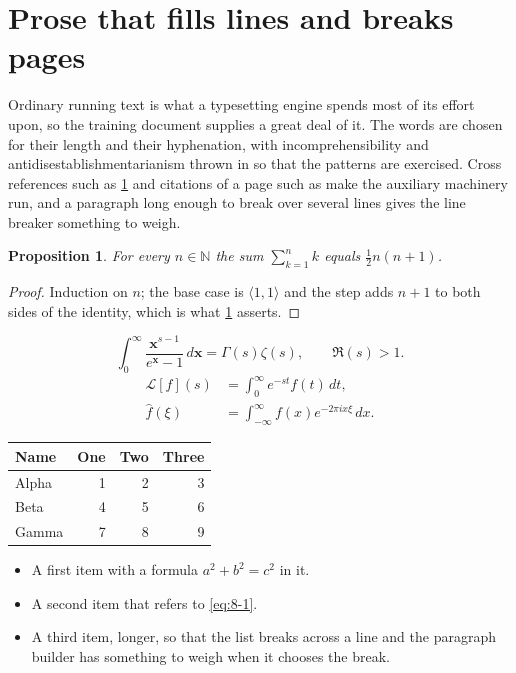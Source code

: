 \documentclass[11pt,a4paper]{report}
\theoremstyle{plain}
\newtheorem{proposition}{Proposition}[chapter]
\newcommand{\vecn}[1]{\mathbf{#1}}
\newcommand{\pairs}[2]{\langle #1,#2\rangle}
\begin{document}
\section{Prose that fills lines and breaks pages}
\label{sec:prose8-1}
Ordinary running text is what a typesetting engine spends most of its effort
upon, so the training document supplies a great deal of it. The words are
chosen for their length and their hyphenation, with incomprehensibility and
antidisestablishmentarianism thrown in so that the patterns are exercised.
Cross references such as \cref{sec:prose8-1} and citations of a page such
as \pageref{sec:prose8-1} make the auxiliary machinery run, and a
paragraph long enough to break over several lines gives the line breaker
something to weigh.
\begin{proposition}\label{prop:8-1}
For every $n\in\mathbb{N}$ the sum $\sum_{k=1}^{n}k$ equals
$\tfrac{1}{2}n(n+1)$.
\end{proposition}
\begin{proof}
Induction on $n$; the base case is $\pairs{1}{1}$ and the step adds $n+1$ to
both sides of the identity, which is what \cref{prop:8-1} asserts.
\end{proof}
\begin{equation}\label{eq:8-1}
  \int_{0}^{\infty}\frac{\vecn{x}^{s-1}}{e^{\vecn{x}}-1}\,d\vecn{x}
    = \Gamma(s)\zeta(s),\qquad \Re(s)>1 .
\end{equation}
\begin{align}
  \mathcal{L}[f](s) &= \int_{0}^{\infty} e^{-st} f(t)\,dt, \\
  \widehat{f}(\xi)  &= \int_{-\infty}^{\infty} f(x) e^{-2\pi i x\xi}\,dx .
\end{align}
\par\noindent\begin{center}
\begin{tabular}{lrrr}
\hline
Name & One & Two & Three \\
\hline
Alpha & 1 & 2 & 3 \\
Beta & 4 & 5 & 6 \\
Gamma & 7 & 8 & 9 \\
\hline
\end{tabular}
\end{center}
\begin{itemize}
  \item A first item with a formula $a^2+b^2=c^2$ in it.
  \item A second item that refers to \eqref{eq:8-1}.
  \item A third item, longer, so that the list breaks across a line and the
    paragraph builder has something to weigh when it chooses the break.
\end{itemize}
\end{document}
